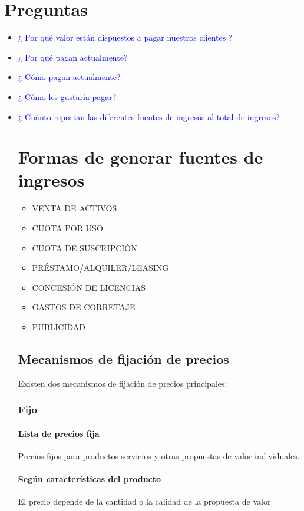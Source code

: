 \documentclass[11pt]{book}
\begin{document}
\section{Preguntas}
\begin{itemize}
\item\textcolor{blue}{¿ Por qué valor están dispuestos a pagar nuestros clientes ?}
\item\textcolor{blue}{¿ Por qué pagan actualmente? }
\item\textcolor{blue}{¿ Cómo pagan actualmente?}
\item\textcolor{blue}{¿ Cómo les gustaría pagar? }
\item\textcolor{blue}{¿ Cuánto reportan las diferentes 
fuentes de ingresos al total de ingresos?}
\section{ Formas de generar fuentes de ingresos}
\begin{itemize}
\item VENTA DE ACTIVOS\\
\item CUOTA POR USO\\
\item CUOTA DE SUSCRIPCIÓN\\
\item PRÉSTAMO/ALQUILER/LEASING
\item CONCESIÓN DE LICENCIAS\\
\item GASTOS DE CORRETAJE\\
\item PUBLICIDAD\\ 
\end{itemize}
\subsection{Mecanismos de fijación de precios}
Existen dos mecanismos de fijación de precios principales:\\
\subsubsection{Fijo}
\paragraph{Lista de precios fija}
Precios fijos para productos servicios y otras propuestas de valor individuales.
\paragraph{Según características del producto}
El precio depende de la cantidad o la calidad de la propuesta de valor

\end{itemize}
\end{document}
